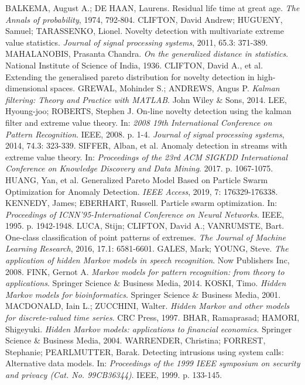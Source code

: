 \documentclass[11pt,twoside,openright]{report}
\begin{document}
\begin{thebibliography}{L}
BALKEMA, August A.; DE HAAN, Laurens. Residual life time at great age. \textit{The Annals of probability}, 1974, 792-804.
CLIFTON, David Andrew; HUGUENY, Samuel; TARASSENKO, Lionel. Novelty detection with multivariate extreme value statistics. \textit{Journal of signal processing systems}, 2011, 65.3: 371-389.
MAHALANOBIS, Prasanta Chandra. \textit{On the generalized distance in statistics}. National Institute of Science of India, 1936.
CLIFTON, David A., et al. Extending the generalised pareto distribution for novelty detection in high-dimensional spaces.
GREWAL, Mohinder S.; ANDREWS, Angus P. \textit{Kalman filtering: Theory and Practice with MATLAB}. John Wiley \& Sons, 2014.
LEE, Hyoung-joo; ROBERTS, Stephen J. On-line novelty detection using the kalman filter and extreme value theory. In: \textit{2008 19th International Conference on Pattern Recognition}. IEEE, 2008. p. 1-4.
 \textit{Journal of signal processing systems}, 2014, 74.3: 323-339.
SIFFER, Alban, et al. Anomaly detection in streams with extreme value theory. In: \textit{Proceedings of the 23rd ACM SIGKDD International Conference on Knowledge Discovery and Data Mining}. 2017. p. 1067-1075.
HUANG, Yan, et al. Generalized Pareto Model Based on Particle Swarm Optimization for Anomaly Detection. \textit{IEEE Access}, 2019, 7: 176329-176338.
KENNEDY, James; EBERHART, Russell. Particle swarm optimization. In: \textit{Proceedings of ICNN'95-International Conference on Neural Networks}. IEEE, 1995. p. 1942-1948.
LUCA, Stijn; CLIFTON, David A.; VANRUMSTE, Bart. One-class classification of point patterns of extremes. \textit{The Journal of Machine Learning Research}, 2016, 17.1: 6581-6601.
GALES, Mark; YOUNG, Steve. \textit{The application of hidden Markov models in speech recognition}. Now Publishers Inc, 2008.
FINK, Gernot A. \textit{Markov models for pattern recognition: from theory to applications}. Springer Science \& Business Media, 2014.
KOSKI, Timo. \textit{Hidden Markov models for bioinformatics}. Springer Science \& Business Media, 2001.
MACDONALD, Iain L.; ZUCCHINI, Walter. \textit{Hidden Markov and other models for discrete-valued time series}. CRC Press, 1997.
BHAR, Ramaprasad; HAMORI, Shigeyuki. \textit{Hidden Markov models: applications to financial economics}. Springer Science \& Business Media, 2004.
WARRENDER, Christina; FORREST, Stephanie; PEARLMUTTER, Barak. Detecting intrusions using system calls: Alternative data models. In: \textit{Proceedings of the 1999 IEEE symposium on security and privacy (Cat. No. 99CB36344)}. IEEE, 1999. p. 133-145.

\end{thebibliography}
\end{document}
